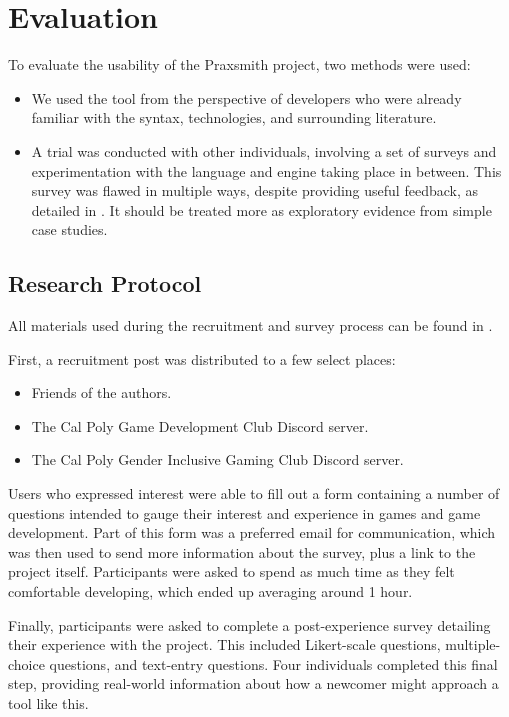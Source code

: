 \chapter{Evaluation} \label{sec:Evaluation}

To evaluate the usability of the Praxsmith project, two methods were used:

\begin{itemize}
    \item We used the tool from the perspective of developers who were already familiar
    with the syntax, technologies, and surrounding literature.
    \item A trial was conducted with other individuals, involving a set of surveys
    and experimentation with the language and engine taking place in between. This
    survey was flawed in multiple ways, despite providing useful feedback, as detailed
    in . It should be treated more as exploratory evidence
    from simple case studies.
\end{itemize}

\section{Research Protocol} \label{sec:ResearchProtocol}

All materials used during the recruitment and survey process can be found in
.

First, a recruitment post was distributed to a few select places:

\begin{itemize}
    \item Friends of the authors.
    \item The Cal Poly Game Development Club Discord server.
    \item The Cal Poly Gender Inclusive Gaming Club Discord server.
\end{itemize}

Users who expressed interest were able to fill out a form containing a number
of questions intended to gauge their interest and experience in games and game
development. Part of this form was a preferred email for communication, which
was then used to send more information about the survey, plus a link to the
project itself. Participants were asked to spend as much time as they felt
comfortable developing, which ended up averaging around 1 hour.

Finally, participants were asked to complete a post-experience survey detailing
their experience with the project. This included Likert-scale questions, multiple-choice
questions, and text-entry questions. Four individuals completed this final step,
providing real-world information about how a newcomer might approach a tool like this.

